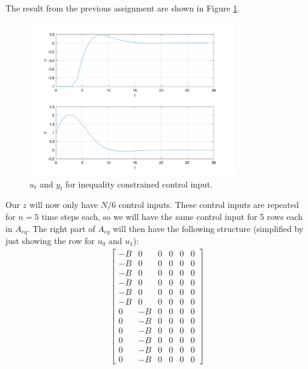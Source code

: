\documentclass[11pt, a4paper, english]{NTNUoving}
\begin{document}
\begin{oppgave}

    \begin{punkt}
        \label{3a}
        The result from the previous assignment are shown in Figure \ref{fig:3a}.

        \begin{figure}[H]
            \centering
            \includegraphics[width=0.8\textwidth]{../3a.png}
            \caption{$u_t$ and $y_t$ for inequality constrained control input.}
            \label{fig:3a}
        \end{figure}
    \end{punkt}

    \begin{punkt}
        Our $z$ will now only have $N/6$ control inputs. These control inputs are repeated for
        $n=5$ time steps each, so we will have the same control input for 5 rows each in $A_{eq}$. The right part of $A_{eq}$ will then have the following structure
        (simplified by just showing the row for $u_0$ and $u_1$):
        \begin{align*}
            \begin{bmatrix}
                -B & 0 & 0 & 0 & 0 & 0 \\
                -B & 0 & 0 & 0 & 0 & 0 \\
                -B & 0 & 0 & 0 & 0 & 0 \\
                -B & 0 & 0 & 0 & 0 & 0 \\
                -B & 0 & 0 & 0 & 0 & 0 \\
                -B & 0 & 0 & 0 & 0 & 0 \\
                0 & -B & 0 & 0 & 0 & 0 \\
                0 & -B & 0 & 0 & 0 & 0 \\
                0 & -B & 0 & 0 & 0 & 0 \\
                0 & -B & 0 & 0 & 0 & 0 \\
                0 & -B & 0 & 0 & 0 & 0 \\
                0 & -B & 0 & 0 & 0 & 0
            \end{bmatrix}
        \end{align*}


\end{punkt}
\end{oppgave}
\end{document}
